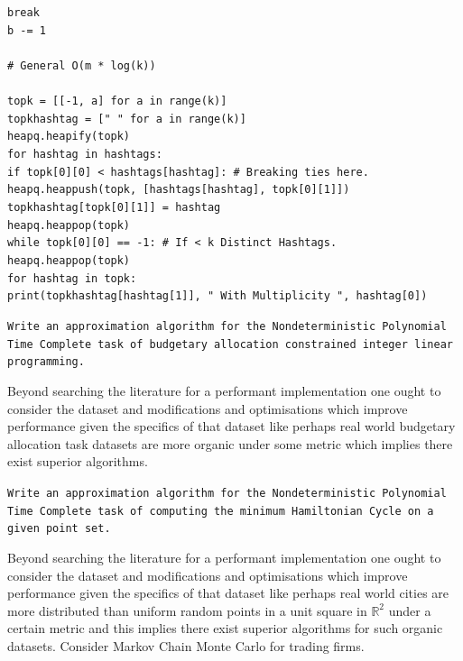\phantom{xxxxxxxxxxxxxxxx}\texttt{break} \\
\phantom{xxxx}\texttt{b -= 1} \\
~\\
\texttt{\# General O(m * log(k))} \\
~\\
\texttt{topk = [[-1, a] for a in range(k)]} \\
\texttt{topkhashtag = [" " for a in range(k)]} \\
\texttt{heapq.heapify(topk)} \\
\texttt{for hashtag in hashtags:} \\
\phantom{xxxx}\texttt{if topk[0][0] < hashtags[hashtag]: \# Breaking ties here.} \\
\phantom{xxxxxxxx}\texttt{heapq.heappush(topk, [hashtags[hashtag], topk[0][1]])} \\
\phantom{xxxxxxxx}\texttt{topkhashtag[topk[0][1]] = hashtag} \\
\phantom{xxxxxxxx}\texttt{heapq.heappop(topk)} \\
\texttt{while topk[0][0] == -1: \# If < k Distinct Hashtags.} \\
\phantom{xxxx}\texttt{heapq.heappop(topk)} \\
\texttt{for hashtag in topk:} \\
\phantom{xxxx}\texttt{print(topkhashtag[hashtag[1]], " With Multiplicity ", hashtag[0])}

\texttt{Write an approximation algorithm for the Nondeterministic Polynomial Time Complete task of budgetary allocation constrained integer linear programming.}

Beyond searching the literature for a performant implementation one ought to consider the dataset and modifications and optimisations which improve performance given the specifics of that dataset like perhaps real world budgetary allocation task datasets are more organic under some metric which implies there exist superior algorithms.

\texttt{Write an approximation algorithm for the Nondeterministic Polynomial Time Complete task of computing the minimum Hamiltonian Cycle on a given point set.}

Beyond searching the literature for a performant implementation one ought to consider the dataset and modifications and optimisations which improve performance given the specifics of that dataset like perhaps real world cities are more distributed than uniform random points in a unit square in $\mathbb{R}^2$ under a certain metric and this implies there exist superior algorithms for such organic datasets. Consider Markov Chain Monte Carlo for trading firms.

